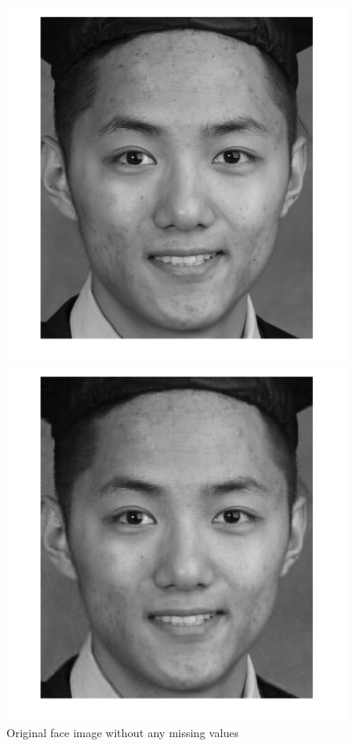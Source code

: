 \documentclass[11pt]{article} %
\begin{document}
\begin{figure}[H]
  \includegraphics[width=\linewidth]{mySelfieOriginal.png}
  \caption{Original face image without any missing values}\label{fig:selfie1}
\endminipage\hfill
{}
  \includegraphics[width=\linewidth]{mySelfie50M100R.png}

\end{figure}
\end{document}

